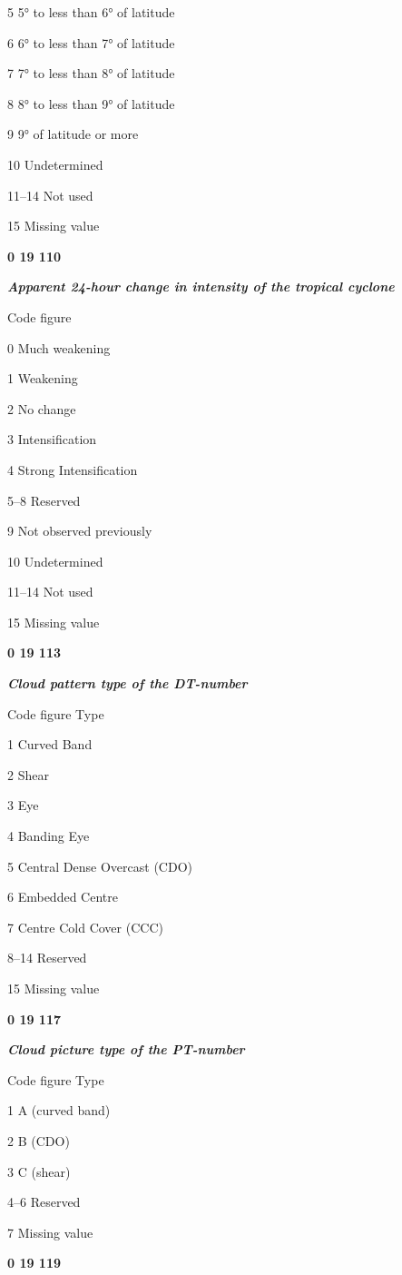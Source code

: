 5 5° to less than 6° of latitude

6 6° to less than 7° of latitude

7 7° to less than 8° of latitude

8 8° to less than 9° of latitude

9 9° of latitude or more

10 Undetermined

11--14 Not used

15 Missing value

\textbf{0 19 110}

\emph{\textbf{Apparent 24-hour change in intensity of the tropical cyclone}}

Code figure

0 Much weakening

1 Weakening

2 No change

3 Intensification

4 Strong Intensification

5--8 Reserved

9 Not observed previously

10 Undetermined

11--14 Not used

15 Missing value

\textbf{0 19 113}

\emph{\textbf{Cloud pattern type of the DT-number}}

Code figure Type

1 Curved Band

2 Shear

3 Eye

4 Banding Eye

5 Central Dense Overcast (CDO)

6 Embedded Centre

7 Centre Cold Cover (CCC)

8--14 Reserved

15 Missing value

\textbf{0 19 117}

\emph{\textbf{Cloud picture type of the PT-number}}

Code figure Type

1 A (curved band)

2 B (CDO)

3 C (shear)

4--6 Reserved

7 Missing value

\textbf{0 19 119}

